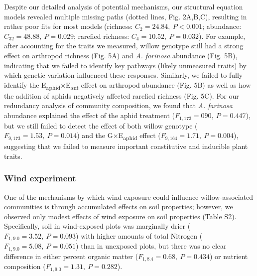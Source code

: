 \documentclass[11pt]{article}
\begin{document}
Despite our detailed analysis of potential mechanisms, our structural
equation models revealed multiple missing paths (dotted lines, Fig.
2A,B,C), resulting in rather poor fits for most models (richness:
\(C_2=24.84,\ P<0.001\); abundance: \(C_{32}=48.88,\ P=0.029\); rarefied richness:
\(C_4=10.52,\ P=0.032\)). For example, after accounting for the traits we
measured, willow genotype still had a strong effect on arthropod
richness (Fig. 5A) and \textit{A. farinosa} abundance (Fig. 5B),
indicating that we failed to identify key pathways (likely unmeasured
traits) by which genetic variation influenced these responses.
Similarly, we failed to fully identify the E\textsubscript{aphid}$\times$E\textsubscript{ant} effect on
arthropod abundance (Fig. 5B) as well as how the addition of aphids
negatively affected rarefied richness (Fig. 5C). For our redundancy
analysis of community composition, we found that \textit{A. farinosa}
abundance explained the effect of the aphid treatment
(\(F_{1,173}=090,\ P=0.447\)), but we still failed to detect the effect of both
willow genotype ($F_{9,173}=1.53,\ P=0.014$) and the G$\times$E\textsubscript{aphid} effect
(\(F_{9,164}=1.71,\ P=0.004\)), suggesting that we failed to measure important
constitutive and inducible plant traits.

\subsubsection*{Wind experiment}

One of the mechanisms by which wind exposure could influence
willow-associated communities is through accumulated effects on soil
properties; however, we observed only modest effects of wind exposure on
soil properties (Table S2). Specifically, soil in wind-exposed plots was
marginally drier (\(F_{1,9.0}=3.52,\ P=0.093\)) with higher amounts of total
Nitrogen (\(F_{1,9.0}=5.08,\ P=0.051\)) than in unexposed plots, but there was no
clear difference in either percent organic matter (\(F_{1,8.4}=0.68,\ P=0.434\)) or
nutrient composition (\(F_{1,9.0}=1.31,\ P=0.282\)).
\end{document}
